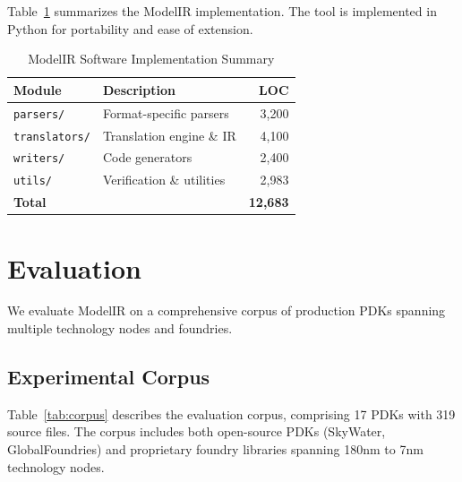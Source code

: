 \documentclass[conference]{IEEEtran}
\begin{document}
Table~\ref{tab:implementation} summarizes the ModelIR implementation. The tool is implemented in Python for portability and ease of extension.

\begin{table}[!t]
\caption{ModelIR Software Implementation Summary}
\label{tab:implementation}
\centering
\renewcommand{\arraystretch}{1.15}
\begin{tabular}{@{}llr@{}}
\toprule
\textbf{Module} & \textbf{Description} & \textbf{LOC} \\
\midrule
\texttt{parsers/} & Format-specific parsers & 3,200 \\
\texttt{translators/} & Translation engine \& IR & 4,100 \\
\texttt{writers/} & Code generators & 2,400 \\
\texttt{utils/} & Verification \& utilities & 2,983 \\
\midrule
\textbf{Total} & & \textbf{12,683} \\
\bottomrule
\end{tabular}
\end{table}

\section{Evaluation}
\label{sec:evaluation}

We evaluate ModelIR on a comprehensive corpus of production PDKs spanning multiple technology nodes and foundries.

\subsection{Experimental Corpus}

Table~\ref{tab:corpus} describes the evaluation corpus, comprising 17 PDKs with 319 source files. The corpus includes both open-source PDKs (SkyWater, GlobalFoundries) and proprietary foundry libraries spanning 180nm to 7nm technology nodes.
\end{document}

